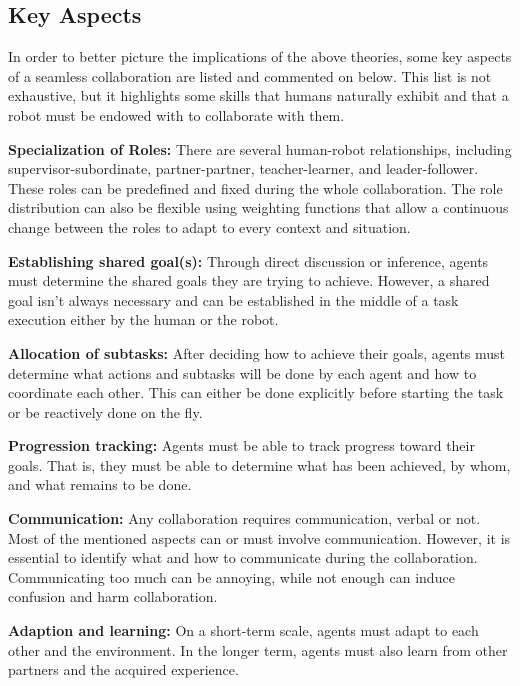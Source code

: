\subsection{Key Aspects}


In order to better picture the implications of the above theories, some key aspects of a seamless collaboration are listed and commented on below. This list is not exhaustive, but it highlights some skills that humans naturally exhibit and that a robot must be endowed with to collaborate with them. 

\textbf{Specialization of Roles:} There are several human-robot relationships, including supervisor-subordinate, partner-partner, teacher-learner, and leader-follower. These roles can be predefined and fixed during the whole collaboration. The role distribution can also be flexible using weighting functions that allow a continuous change between the roles to adapt to every context and situation.

\textbf{Establishing shared goal(s):} Through direct discussion or inference, agents must determine the shared goals they are trying to achieve. However, a shared goal isn't always necessary and can be established in the middle of a task execution either by the human or the robot.

\textbf{Allocation of subtasks:} After deciding how to achieve their goals, agents must determine what actions and subtasks will be done by each agent and how to coordinate each other. This can either be done explicitly before starting the task or be reactively done on the fly.

\textbf{Progression tracking:} Agents must be able to track progress toward their goals. That is, they must be able to determine what has been achieved, by whom, and what remains to be done. 

\textbf{Communication:} Any collaboration requires communication, verbal or not. Most of the mentioned aspects can or must involve communication. However, it is essential to identify what and how to communicate during the collaboration. Communicating too much can be annoying, while not enough can induce confusion and harm collaboration.

\textbf{Adaption and learning:} On a short-term scale, agents must adapt to each other and the environment. In the longer term, agents must also learn from other partners and the acquired experience.

